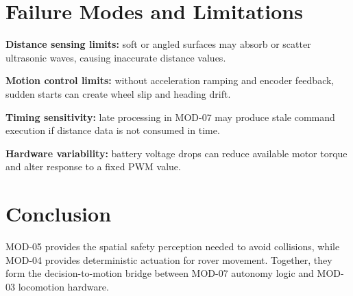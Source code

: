 \documentclass[a4paper,11pt]{article}
\begin{document}
\section{Failure Modes and Limitations}

\textbf{Distance sensing limits:}
soft or angled surfaces may absorb or scatter ultrasonic waves, causing
inaccurate distance values.

\textbf{Motion control limits:}
without acceleration ramping and encoder feedback, sudden starts can create
wheel slip and heading drift.

\textbf{Timing sensitivity:}
late processing in MOD-07 may produce stale command execution if distance data
is not consumed in time.

\textbf{Hardware variability:}
battery voltage drops can reduce available motor torque and alter response to a
fixed PWM value.

\section{Conclusion}

MOD-05 provides the spatial safety perception needed to avoid collisions, while
MOD-04 provides deterministic actuation for rover movement. Together, they form
the decision-to-motion bridge between MOD-07 autonomy logic and MOD-03
locomotion hardware.
\end{document}
